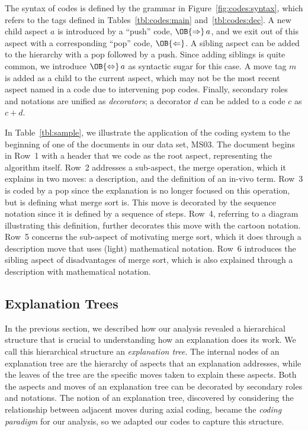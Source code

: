 \documentclass[sigconf]{acmart}
\newcommand{\Push}{\OB{\Rightarrow}}
\newcommand{\Pop}{\OB{\Leftarrow}}
\newcommand{\PopPush}{\OB{\Leftrightarrow}}
\begin{document}
The syntax of codes is defined by the grammar in Figure~\ref{fig:codes:syntax},
which refers to the tags defined in Tables~\ref{tbl:codes:main}
and~\ref{tbl:codes:dec}.
%
A new child aspect $a$ is introduced by a ``push'' code, $\Push\,a$, and we
exit out of this aspect with a corresponding ``pop'' code, $\Pop$. A sibling
aspect can be added to the hierarchy with a pop followed by a push. Since
adding siblings is quite common, we introduce $\PopPush\,a$ as syntactic sugar
for this case.
%
A move tag $m$ is added as a child to the current aspect, which may not be the
most recent aspect named in a code due to intervening pop codes.
%
Finally, secondary roles and notations are unified as \emph{decorators}; a
decorator $d$ can be added to a code $c$ as $c+d$.





In Table~\ref{tbl:sample}, we illustrate the application of the coding system
to the beginning of one of the documents in our data set, MS03.
%
The document begins in Row~1 with a header that we code as the root aspect,
representing the algorithm itself. Row~2 addresses a sub-aspect, the merge
operation, which it explains in two moves: a description, and the definition of
an in-vivo term.
%
Row~3 is coded by a pop since the explanation is no longer focused on this
operation, but is defining what merge sort is. This move is decorated by the
sequence notation since it is defined by a sequence of steps.
%
Row~4, referring to a diagram illustrating this definition, further decorates
this move with the cartoon notation.
%
Row~5 concerns the sub-aspect of motivating merge sort, which it does through a
description move that uses (light) mathematical notation.
%
Row~6 introduces the sibling aspect of disadvantages of merge sort, which is
also explained through a description with mathematical notation.



\subsection{Explanation Trees}
\label{sec:res:xopTree}

In the previous section, we described how our analysis revealed a hierarchical
structure that is crucial to understanding how an explanation does its work.
%
We call this hierarchical structure an \emph{explanation tree}. The internal
nodes of an explanation tree are the hierarchy of aspects that an explanation
addresses, while the leaves of the tree are the specific moves taken to explain
these aspects. Both the aspects and moves of an explanation tree can be
decorated by secondary roles and notations.
%
The notion of an explanation tree, discovered by considering the relationship
between adjacent moves during axial coding, became the \emph{coding paradigm}
for our analysis, so we adapted our codes to capture this structure.
\end{document}
